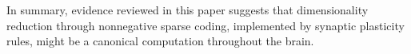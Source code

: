 


In summary, evidence reviewed in this paper suggests
that dimensionality reduction through nonnegative sparse coding, 
implemented by synaptic plasticity rules, 
might be a canonical computation throughout the brain.
